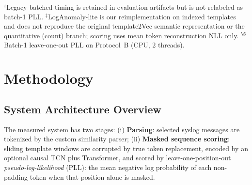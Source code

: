 \documentclass[a4paper]{llncs}
\renewcommand{\arraystretch}{0.95}
\begin{document}
\begin{table}[htbp]
\caption{Qualitative comparison of related detectors. Latency is \emph{not} cross-comparable: this work reports batch-1 leave-one-out PLL; DeepLog/LogAnomaly-lite legacy batched scoring is NR for batch-1.}
\label{tab_related_comparison}
\centering
\setlength{\tabcolsep}{4.0pt}
\renewcommand{\arraystretch}{0.92}
\vspace{2pt}
\parbox{\textwidth}{\footnotesize
$^\dagger$Legacy batched timing is retained in evaluation artifacts but is not relabeled as batch-1 PLL.
$^\ddagger$LogAnomaly-lite is our reimplementation on indexed templates and does not reproduce the original template2Vec semantic representation or the quantitative (count) branch; scoring uses mean token reconstruction NLL only.
$^\S$Batch-1 leave-one-out PLL on Protocol~B (CPU, 2 threads).}
\end{table}

\section{Methodology}
\subsection{System Architecture Overview}
The measured system has two stages:
(i) \textbf{Parsing}: selected syslog messages are tokenized by the custom similarity parser;
(ii) \textbf{Masked sequence scoring}: sliding template windows are corrupted by true token replacement, encoded by an optional causal TCN plus Transformer, and scored by leave-one-position-out \emph{pseudo-log-likelihood} (PLL): the mean negative log probability of each non-padding token when that position alone is masked.
\end{document}
